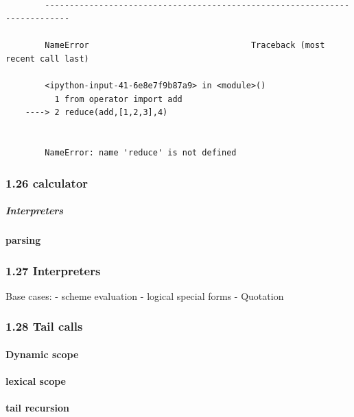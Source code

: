 \documentclass[11pt]{article}
\begin{document}
    \begin{Verbatim}[commandchars=\\\{\}]

        ---------------------------------------------------------------------------

        NameError                                 Traceback (most recent call last)

        <ipython-input-41-6e8e7f9b87a9> in <module>()
          1 from operator import add
    ----> 2 reduce(add,[1,2,3],4)
    

        NameError: name 'reduce' is not defined

    \end{Verbatim}

    \subsubsection{1.26 calculator}\label{calculator}

\subparagraph{Interpreters}\label{interpreters}

\paragraph{parsing}\label{parsing}

    \subsubsection{1.27 Interpreters}\label{interpreters}

Base cases: - scheme evaluation - logical special forms - Quotation

    \subsubsection{1.28 Tail calls}\label{tail-calls}

\paragraph{Dynamic scope}\label{dynamic-scope}

\paragraph{lexical scope}\label{lexical-scope}

\paragraph{tail recursion}\label{tail-recursion}
\end{document}
